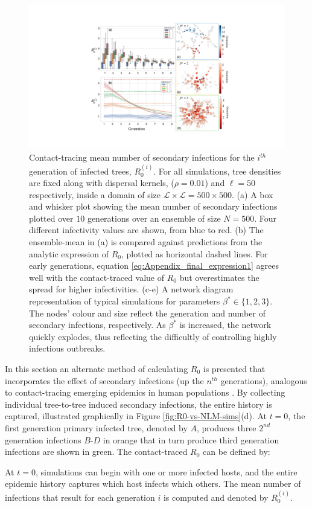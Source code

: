 \begin{figure}
    \centering
    \includegraphics[scale=0.475]{chapter5/figures/fig5-R0-contact.pdf}
    \caption{Contact-tracing mean number of secondary infections for the $i^{th}$ generation of infected trees, $R^{(i)}_0$. For all simulations, tree densities are fixed along with dispersal kernels, ($\rho=0.01$) and $\ell=50$ respectively, inside a domain of size $\mathcal{L \times L} = 500 \times 500$.
    (a) A box and whisker plot showing the mean number of secondary infections plotted over $10$ generations over an ensemble of size $N=500$. Four different infectivity values are shown, from blue to red. (b) The ensemble-mean in (a) is compared against predictions from the analytic expression of $R_0$, plotted as horizontal dashed lines. For early generations, equation \ref{eq:Appendix_final_expression1} agrees well with the contact-traced value of $R_0$ but overestimates the spread for higher infectivities. (c-e) A network diagram representation of typical simulations for parameters $\beta^* \in \lbrace 1, 2, 3 \rbrace $. The nodes' colour and size reflect the generation and number of secondary infections, respectively. As $\beta^*$ is increased, the network quickly explodes\textemdash, thus reflecting the difficultly of controlling highly infectious outbreaks.}
    \label{fig:contact-trace}
\end{figure}


In this section an alternate method of calculating $R_0$ is presented that incorporates the effect of secondary infections  
(up the $n^{th}$ generations), analogous to contact-tracing emerging epidemics in human populations \cite{eames2003contact}.
By collecting individual tree-to-tree induced secondary infections, the entire history is captured, illustrated graphically in Figure \ref{fig:R0-vs-NLM-sims}(d).
At $t=0$, the first generation primary infected tree, denoted by $A$, produces three $2^{nd}$ generation infections $B$-$D$ in orange that in turn produce
third generation infections are shown in green.
The contact-traced $R_0$ can be defined by:
\begin{defn} %
\label{def:R0_contact_traced}
At $t=0$, simulations can begin with one or more infected hosts, and the entire epidemic history captures which host infects which others.
The mean number of infections that result for each generation $i$ is computed and denoted by $R^{(i)}_0$.
\end{defn}

